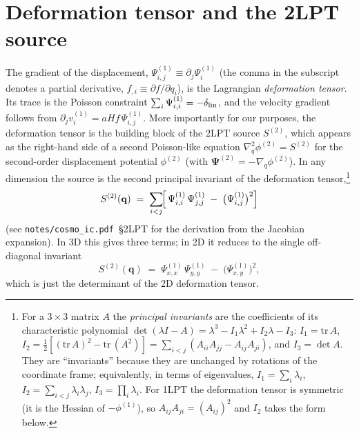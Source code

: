 \documentclass[12pt]{article}
\newcommand{\notecosmoic}{\texttt{notes/cosmo\_ic.pdf}\xspace}
\begin{document}
\section{Deformation tensor and the 2LPT source}\label{sec:deformation}

The gradient of the displacement, $\Psi^{(1)}_{i,j} \equiv \partial_j\Psi^{(1)}_i$
(the comma in the subscript denotes a partial derivative, $f_{,i}\equiv\partial f/\partial q_i$),
is the Lagrangian \emph{deformation tensor}. Its trace is the Poisson
constraint $\sum_i\Psi^{(1)}_{i,i} = -\delta_{\rm lin}$, and the velocity gradient
follows from $\partial_j v^{(1)}_i = aHf\,\Psi^{(1)}_{i,j}$. More importantly
for our purposes, the deformation tensor is the building block of the
2LPT source $S^{(2)}$, which appears as the right-hand side of a
second Poisson-like equation
$\nabla_q^2\phi^{(2)} = S^{(2)}$ for the second-order displacement
potential $\phi^{(2)}$ (with $\boldsymbol\Psi^{(2)} = -\nabla_q\phi^{(2)}$).
In any dimension the source is the second principal invariant of the
deformation tensor,\footnote{For a $3\times 3$ matrix $A$ the
\emph{principal invariants} are the coefficients of its characteristic
polynomial $\det(\lambda I - A) = \lambda^3 - I_1\lambda^2 + I_2\lambda - I_3$:
$I_1 = \mathrm{tr}\, A$, $I_2 = \tfrac{1}{2}[(\mathrm{tr}\, A)^2 - \mathrm{tr}\,(A^2)] = \sum_{i<j}(A_{ii}A_{jj}-A_{ij}A_{ji})$,
and $I_3 = \det A$. They are ``invariants'' because they are unchanged
by rotations of the coordinate frame; equivalently, in terms of
eigenvalues, $I_1=\sum_i\lambda_i$, $I_2=\sum_{i<j}\lambda_i\lambda_j$,
$I_3=\prod_i\lambda_i$. For 1LPT the deformation tensor is symmetric
(it is the Hessian of $-\phi^{(1)}$), so $A_{ij}A_{ji}=(A_{ij})^2$ and
$I_2$ takes the form below.}
\begin{equation}
  S^{(2)}(\mathbf q) \;=\;
    \sum_{i<j}\!\Bigl[\,\Psi^{(1)}_{i,i}\,\Psi^{(1)}_{j,j}
                       \;-\;\bigl(\Psi^{(1)}_{i,j}\bigr)^2\Bigr]
\end{equation}
(see \notecosmoic~\S2LPT for the derivation from the
Jacobian expansion). In 3D this gives three terms; in 2D it
reduces to the single off-diagonal invariant
\begin{equation}\label{eq:s2}
  S^{(2)}(\mathbf q) \;=\; \Psi^{(1)}_{x,x}\,\Psi^{(1)}_{y,y}
                          \;-\;\bigl(\Psi^{(1)}_{x,y}\bigr)^2,
\end{equation}
which is just the determinant of the 2D deformation tensor.
\end{document}
